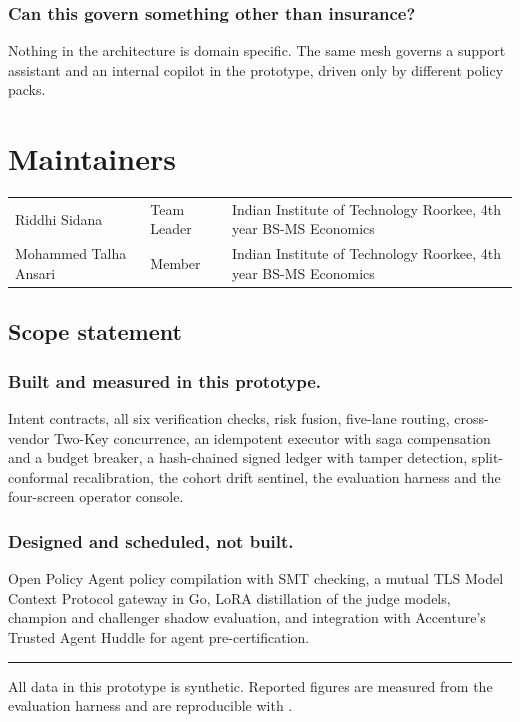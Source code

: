 \documentclass[10pt]{article}
\begin{document}
\subsubsection{Can this govern something other than insurance?}
Nothing in the architecture is domain specific. The same mesh governs a support assistant
and an internal copilot in the prototype, driven only by different policy packs.

\section{Maintainers}

\vspace{2pt}
{\small
\begin{xltabular}{\textwidth}{@{}L{0.28\textwidth}L{0.18\textwidth}Y@{}}
\toprule
{} &  &  \\
\midrule
Riddhi Sidana & Team Leader & Indian Institute of Technology Roorkee, 4th year BS-MS Economics \\
Mohammed Talha Ansari & Member & Indian Institute of Technology Roorkee, 4th year BS-MS Economics \\
\bottomrule
\end{xltabular}}

\subsection{Scope statement}

\subsubsection{Built and measured in this prototype.}
Intent contracts, all six verification checks, risk fusion, five-lane routing,
cross-vendor Two-Key concurrence, an idempotent executor with saga compensation and a
budget breaker, a hash-chained signed ledger with tamper detection, split-conformal
recalibration, the cohort drift sentinel, the evaluation harness and the four-screen
operator console.

\subsubsection{Designed and scheduled, not built.}
Open Policy Agent policy compilation with SMT checking, a mutual TLS Model Context
Protocol gateway in Go, LoRA distillation of the judge models, champion and challenger
shadow evaluation, and integration with Accenture's Trusted Agent Huddle for agent
pre-certification.

\vspace{10pt}
{\color{rule}\rule{\textwidth}{0.4pt}}\par\vspace{6pt}
{\footnotesize\color{ink3}
All data in this prototype is synthetic. Reported figures are measured from the evaluation
harness and are reproducible with .}
\end{document}
